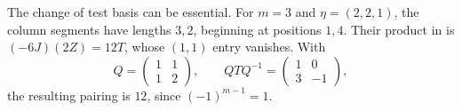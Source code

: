 \begin{example}\label{path:conjugation-example}
The change of test basis can be essential. For $m=3$ and
$\eta=(2,2,1)$, the column segments have lengths $3,2$, beginning at
positions $1,4$. Their product in  is
$(-6J)(2Z)=12T$, whose $(1,1)$ entry vanishes. With
\[
 Q=\begin{pmatrix}1&1\\1&2\end{pmatrix},\qquad
 QTQ^{-1}=\begin{pmatrix}1&0\\3&-1\end{pmatrix},
\]
the resulting pairing is $12$, since $(-1)^{m-1}=1$.
\end{example}
